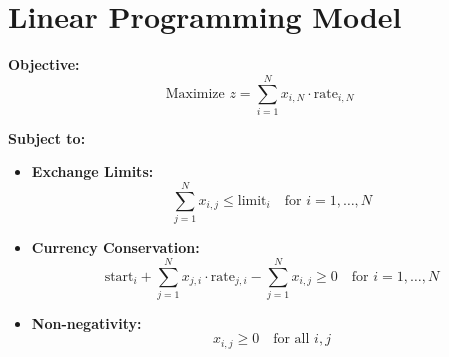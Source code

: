 \documentclass{article}
\begin{document}
\section*{Linear Programming Model}

\textbf{Objective:}
\[
\text{Maximize } z = \sum_{i=1}^{N} x_{i,N} \cdot \text{rate}_{i,N}
\]

\textbf{Subject to:}

\begin{itemize}

\item \textbf{Exchange Limits:}
\[
\sum_{j=1}^{N} x_{i,j} \leq \text{limit}_i \quad \text{for } i = 1, \ldots, N
\]

\item \textbf{Currency Conservation:}
\[
\text{start}_i + \sum_{j=1}^{N} x_{j,i} \cdot \text{rate}_{j,i} - \sum_{j=1}^{N} x_{i,j} \geq 0 \quad \text{for } i = 1, \ldots, N
\]

\item \textbf{Non-negativity:}
\[
x_{i,j} \geq 0 \quad \text{for all } i, j
\]

\end{itemize}
\end{document}

